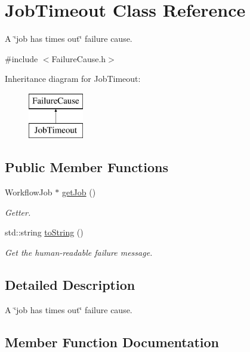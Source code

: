 \hypertarget{class_job_timeout}{}\section{Job\+Timeout Class Reference}
\label{class_job_timeout}


A \char`\"{}job has times out\char`\"{} failure cause.  




{\ttfamily \#include $<$Failure\+Cause.\+h$>$}

Inheritance diagram for Job\+Timeout\+:\begin{figure}[H]
\begin{center}
\leavevmode
\includegraphics[height=2.000000cm]{class_job_timeout}
\end{center}
\end{figure}
\subsection*{Public Member Functions}
\begin{DoxyCompactItemize}
\item 
Workflow\+Job $\ast$ \hyperlink{class_job_timeout_a9b9c85721aff52bbc932c4d9c64aed04}{get\+Job} ()
\begin{DoxyCompactList}\small\item\em Getter. \end{DoxyCompactList}\item 
std\+::string \hyperlink{class_job_timeout_ad5c2b85eb741482c42da8b1509af9eca}{to\+String} ()
\begin{DoxyCompactList}\small\item\em Get the human-\/readable failure message. \end{DoxyCompactList}\end{DoxyCompactItemize}


\subsection{Detailed Description}
A \char`\"{}job has times out\char`\"{} failure cause. 

\subsection{Member Function Documentation}
\mbox{\label{class_job_timeout_a9b9c85721aff52bbc932c4d9c64aed04}} 

